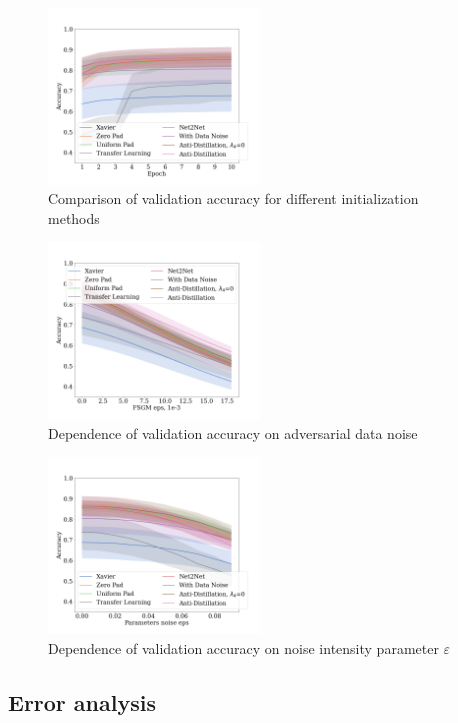 \documentclass[conference]{IEEEtran}
\begin{document}
\begin{figure}[!t]
\centering
  \includegraphics[width=0.5\textwidth]{figures/file.png}
 \caption{Comparison of validation accuracy for different initialization methods}
  \label{fig:1}
\end{figure}
\begin{figure}[!t]
\centering
  \includegraphics[width=0.5\textwidth]{figures/fsgm.png}
 \caption{Dependence of validation accuracy on adversarial data noise}
  \label{fig:2}
\end{figure}
\begin{figure}[!t]
\centering
  \includegraphics[width=0.5\textwidth]{figures/noise.png}
 \caption{Dependence of validation accuracy on noise intensity parameter $\varepsilon$}
  \label{fig:3}
\end{figure}

\subsection{Error analysis}
\end{document}
